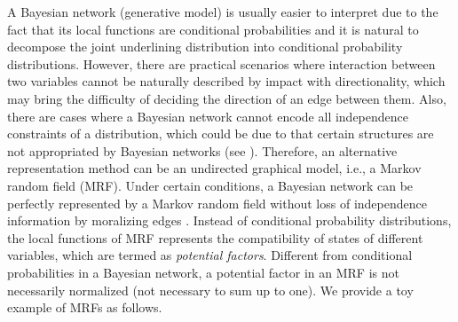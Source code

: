 A Bayesian network (generative model) is usually easier to interpret due to the fact that its local functions are conditional probabilities and it is natural to decompose the joint underlining distribution into conditional probability distributions. However, there are practical scenarios where interaction between two variables cannot be naturally described by impact with directionality, which may bring the difficulty of deciding the direction of an edge between them. Also, there are cases where a Bayesian network cannot encode all independence constraints of a distribution, which could be due to that certain structures are not appropriated by Bayesian networks (see \cite[Section~3.4.2]{koller2009pgm}). Therefore, an alternative representation method can be an undirected graphical model, i.e., a Markov random field (MRF). Under certain conditions, a Bayesian network can be perfectly represented by a Markov random field without loss of independence information by moralizing edges \cite[Section~4.5]{koller2009pgm}\cite[Section~8.3.4]{Bishop:2006:PRM:1162264}. Instead of conditional probability distributions, the local functions of MRF represents the compatibility of states of different variables, which are termed as \textit{potential factors}. Different from conditional probabilities in a Bayesian network, a potential factor in an MRF is not necessarily normalized (not necessary to sum up to one). We provide a toy example of MRFs as follows.
